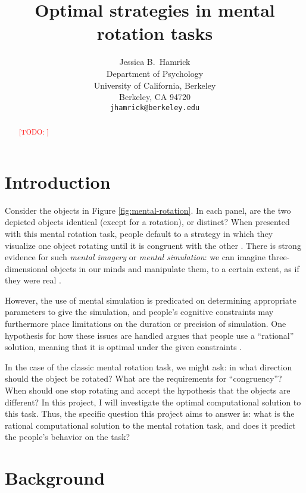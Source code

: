 \documentclass{article} %
\title{Optimal strategies in mental rotation tasks}
\author{Jessica B.~Hamrick\\
  Department of Psychology\\
  University of California, Berkeley\\
  Berkeley, CA 94720\\
  \texttt{jhamrick@berkeley.edu}}
\newcommand{\TODO}[1]{\textcolor{red}{[TODO: #1]}}
\begin{document}
\maketitle

\begin{abstract}
\TODO{}
\end{abstract}

\section{Introduction}


Consider the objects in Figure \ref{fig:mental-rotation}. In each
panel, are the two depicted objects identical (except for a rotation),
or distinct? When presented with this mental rotation task, people
default to a strategy in which they visualize one object rotating
until it is congruent with the other \cite{Shepard1971}. There is
strong evidence for such \textit{mental imagery} or \textit{mental
  simulation}: we can imagine three-dimensional objects in our minds
and manipulate them, to a certain extent, as if they were real
\cite{Kosslyn:2009tj}.

However, the use of mental simulation is predicated on determining
appropriate parameters to give the simulation, and people's cognitive
constraints may furthermore place limitations on the duration or
precision of simulation. One hypothesis for how these issues are
handled argues that people use a ``rational'' solution, meaning that
it is optimal under the given constraints
\cite{Lieder:2012wg,Vul:2009wy,Griffiths2012a}.

In the case of the classic mental rotation task, we might ask: in what
direction should the object be rotated?  What are the requirements for
``congruency''? When should one stop rotating and accept the
hypothesis that the objects are different? In this project, I will
investigate the optimal computational solution to this task. Thus, the
specific question this project aims to answer is: what is the rational
computational solution to the mental rotation task, and does it
predict the people's behavior on the task?

\section{Background}

\end{document}
